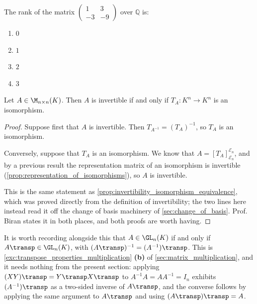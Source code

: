\begin{exercise}
\label{exc:rank_2x2_matrix_sc}
The rank of the matrix $\left(\begin{smallmatrix} 1 & 3 \\ -3 & -9 \end{smallmatrix}\right)$ over $\mathbb{Q}$ is:
\begin{enumerate}
    \item $0$
    \item $1$
    \item $2$
    \item $3$
\end{enumerate}
\end{exercise}

\begin{lemma}
\label{lemma:invertible_iff_T_A_iso}
Let $A \in \M_{n \times n}(K)$. Then $A$ is invertible if and only if $T_A: K^n \to K^n$ is an isomorphism.
\end{lemma}

\begin{proof}
Suppose first that $A$ is invertible. Then $T_{A^{-1}} = (T_A)^{-1}$, so $T_A$ is an isomorphism.

Conversely, suppose that $T_A$ is an isomorphism. We know that $A = [T_A]_{\mathcal{E}_n}^{\mathcal{E}_n}$, and by a previous result the representation matrix of an isomorphism is invertible (\cref{prop:representation_of_isomorphisms}), so $A$ is invertible.

This is the same statement as \cref{prop:invertibility_isomorphism_equivalence}, which was proved directly from the definition of invertibility; the two lines here instead read it off the change of basis machinery of \cref{sec:change_of_basis}. Prof. Biran states it in both places, and both proofs are worth having.
\end{proof}

\begin{remark}
\label{rem:transpose_invertibility}
It is worth recording alongside this that $A \in \GL_n(K)$ if and only if $A\transp \in \GL_n(K)$, with $(A\transp)^{-1} = (A^{-1})\transp$. This is \cref{exc:transpose_properties_multiplication} \textbf{(b)} of \cref{sec:matrix_multiplication}, and it needs nothing from the present section: applying $(XY)\transp = Y\transp X\transp$ to $A^{-1}A = A A^{-1} = I_n$ exhibits $(A^{-1})\transp$ as a two-sided inverse of $A\transp$, and the converse follows by applying the same argument to $A\transp$ and using $(A\transp)\transp = A$.
\end{remark}

